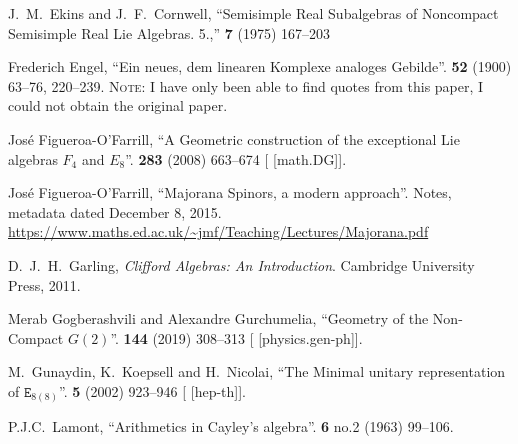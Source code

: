 \begin{thebibliography}{99}
J.~M.~Ekins and J.~F.~Cornwell,
``Semisimple Real Subalgebras of Noncompact Semisimple Real Lie Algebras. 5.,''
 \textbf{7} (1975) 167--203
{\tt{}}

Frederich Engel,
``Ein neues, dem linearen Komplexe analoges Gebilde''.
\textbf{52} (1900) 63--76, 220--239.
\textsc{Note:} I have only been able to find quotes from this paper, I
could not obtain the original paper.

Jos\'e Figueroa-O'Farrill,
``A Geometric construction of the exceptional Lie algebras $F_{4}$ and $E_{8}$''.
 \textbf{283} (2008) 663--674
{\tt{}}
[ [math.DG]].

Jos\'e Figueroa-O'Farrill,
``Majorana Spinors, a modern approach''.
Notes, metadata dated December 8, 2015.
\url{https://www.maths.ed.ac.uk/~jmf/Teaching/Lectures/Majorana.pdf}

  
D.~J.~H.~Garling,
\textit{Clifford Algebras: An Introduction}.
Cambridge University Press, 2011.

Merab Gogberashvili and Alexandre Gurchumelia,
``Geometry of the Non-Compact $G(2)$''.
 \textbf{144} (2019) 308--313
{\tt{}}
[ [physics.gen-ph]].

M.~Gunaydin, K.~Koepsell and H.~Nicolai,
``The Minimal unitary representation of $\mathtt{E}_{8(8)}$''.
 \textbf{5} (2002) 923--946
{\tt{}}
[ [hep-th]].

P.J.C.~Lamont,
``Arithmetics in Cayley's algebra''.
 \textbf{6} no.2 (1963) 99--106.
{\tt{}}


\end{thebibliography}
